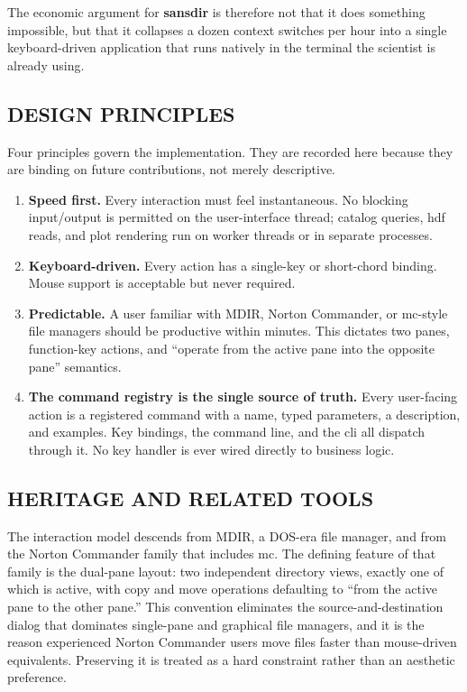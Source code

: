 \documentclass[tm]{ornltm}
\begin{document}
The economic argument for \textbf{sansdir} is therefore not that it does
something impossible, but that it collapses a dozen context switches per hour
into a single keyboard-driven application that runs natively in the terminal the
scientist is already using.

\subsection{DESIGN PRINCIPLES}
\label{sec:principles}

Four principles govern the implementation. They are recorded here because they
are binding on future contributions, not merely descriptive.

\begin{enumerate}
  \item \textbf{Speed first.} Every interaction must feel instantaneous. No
    blocking input/output is permitted on the user-interface thread; catalog
    queries, \ac{hdf} reads, and plot rendering run on worker threads or in
    separate processes.
  \item \textbf{Keyboard-driven.} Every action has a single-key or short-chord
    binding. Mouse support is acceptable but never required.
  \item \textbf{Predictable.} A user familiar with MDIR, Norton Commander, or
    \ac{mc}-style file managers \autocite{midnightcommander} should be productive
    within minutes. This dictates two panes, function-key actions, and
    ``operate from the active pane into the opposite pane'' semantics.
  \item \textbf{The command registry is the single source of truth.} Every
    user-facing action is a registered command with a name, typed parameters, a
    description, and examples. Key bindings, the command line, and the \ac{cli}
    all dispatch through it. No key handler is ever wired directly to
    business logic.
\end{enumerate}

\subsection{HERITAGE AND RELATED TOOLS}

The interaction model descends from MDIR, a DOS-era file manager, and from the
Norton Commander family that includes \ac{mc}. The defining feature of that
family is the dual-pane layout: two independent directory views, exactly one of
which is active, with copy and move operations defaulting to ``from the active
pane to the other pane.'' This convention eliminates the source-and-destination
dialog that dominates single-pane and graphical file managers, and it is the
reason experienced Norton Commander users move files faster than mouse-driven
equivalents. Preserving it is treated as a hard constraint rather than an
aesthetic preference.
\end{document}
